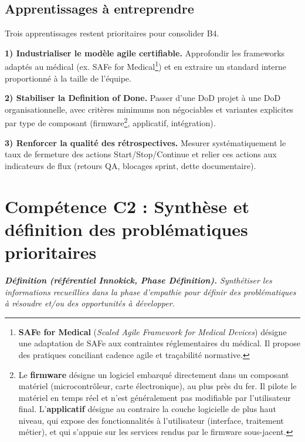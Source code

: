 \subsection{Apprentissages à entreprendre}

Trois apprentissages restent prioritaires pour consolider B4.

\textbf{1) Industrialiser le modèle agile certifiable.}
Approfondir les frameworks adaptés au médical (ex. SAFe for Medical\footnote{\textbf{SAFe for Medical} (\emph{Scaled Agile Framework for Medical Devices}) désigne une adaptation de SAFe aux contraintes réglementaires du médical. Il propose des pratiques conciliant cadence agile et traçabilité normative.}) et en extraire un standard interne proportionné à la taille de l'équipe.

\textbf{2) Stabiliser la Definition of Done.}
Passer d'une DoD projet à une DoD organisationnelle, avec critères minimums non négociables et variantes explicites par type de composant (firmware\footnote{Le \textbf{firmware} d\'esigne un logiciel embarqu\'e directement dans un composant mat\'eriel (microcontr\^oleur, carte \'electronique), au plus pr\`es du fer. Il pilote le mat\'eriel en temps r\'eel et n'est g\'en\'eralement pas modifiable par l'utilisateur final. L'\textbf{applicatif} d\'esigne au contraire la couche logicielle de plus haut niveau, qui expose des fonctionnalit\'es \`a l'utilisateur (interface, traitement m\'etier), et qui s'appuie sur les services rendus par le firmware sous-jacent.}, applicatif, intégration).

\textbf{3) Renforcer la qualité des rétrospectives.}
Mesurer systématiquement le taux de fermeture des actions Start/Stop/Continue et relier ces actions aux indicateurs de flux (retours QA, blocages sprint, dette documentaire).

\section{Compétence C2 : Synthèse et définition des problématiques prioritaires}
\label{sec:competence-c2}

\begin{tcolorbox}[colback=gray!5, colframe=gray!40, boxrule=0.4pt, arc=3pt,
  left=8pt, right=8pt, top=6pt, bottom=6pt]
\small\itshape
\textbf{Définition (référentiel Innokick, Phase Définition).}
Synthétiser les informations recueillies dans la phase d'empathie\footnotemark{} pour définir des problématiques à résoudre et/ou des opportunités à développer.
\end{tcolorbox}

